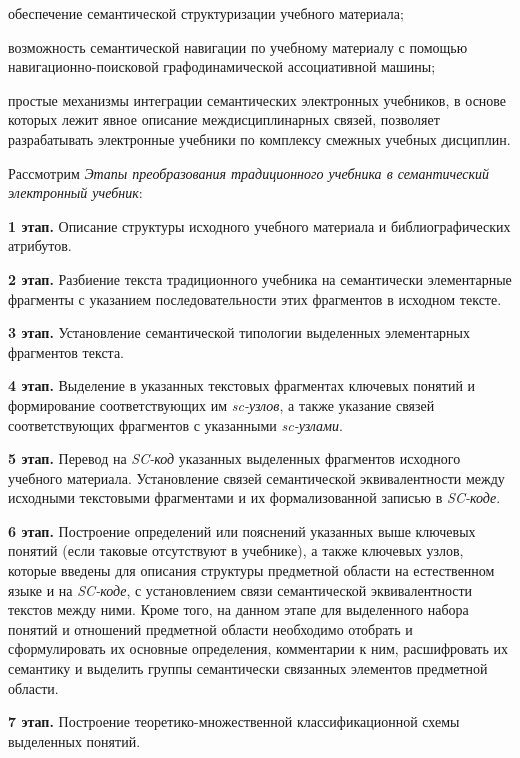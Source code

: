 {\begin{textitemize}
	\item
	обеспечение семантической структуризации учебного материала;
	\item
	возможность семантической навигации по учебному материалу с помощью навигационно-поисковой графодинамической ассоциативной машины;
	\item
	простые механизмы интеграции семантических электронных учебников, в основе которых лежит явное описание междисциплинарных связей, позволяет разрабатывать электронные учебники по комплексу смежных учебных дисциплин.
\end{textitemize}

Рассмотрим \textit{Этапы преобразования традиционного учебника в семантический электронный учебник}:

\textbf{1 этап.} Описание структуры исходного учебного материала и библиографических атрибутов.

\textbf{2 этап.} Разбиение текста традиционного учебника на семантически элементарные фрагменты с указанием последовательности этих фрагментов в исходном тексте.

\textbf{3 этап.} Установление семантической типологии выделенных элементарных фрагментов текста.

\textbf{4 этап.} Выделение в указанных текстовых фрагментах ключевых понятий и формирование соответствующих им \textit{sc-узлов}, а также указание связей соответствующих фрагментов с указанными \textit{sc-узлами}.

\textbf{5 этап.} Перевод на \textit{SC-код} указанных выделенных фрагментов исходного учебного материала. Установление связей семантической эквивалентности между исходными текстовыми фрагментами и их формализованной записью в \textit{SC-коде}.

\textbf{6 этап.} Построение определений или пояснений указанных выше ключевых понятий (если таковые отсутствуют в учебнике), а также ключевых узлов, которые введены для описания структуры предметной области на естественном языке и на \textit{SC-коде}, с установлением связи семантической эквивалентности текстов между ними. Кроме того, на данном этапе для выделенного набора понятий и отношений предметной области необходимо отобрать и сформулировать их основные определения, комментарии к ним, расшифровать их семантику и выделить группы семантически связанных элементов предметной области.

\textbf{7 этап.} Построение теоретико-множественной классификационной схемы выделенных понятий.

}
